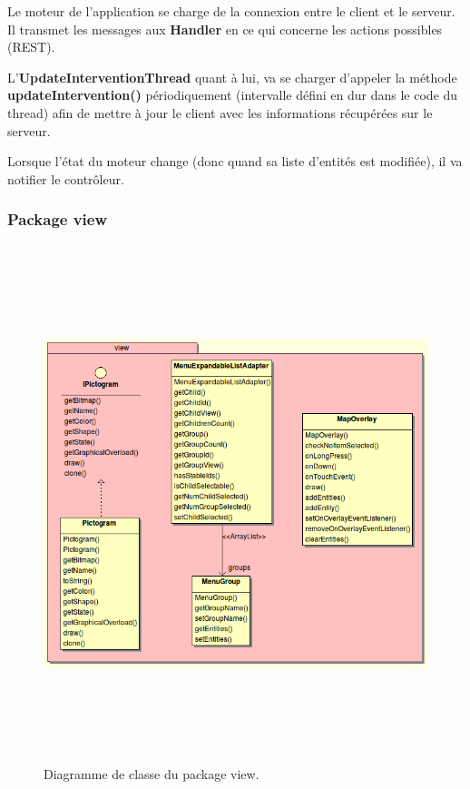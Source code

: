 \documentclass{article}
\begin{document}
Le moteur de l’application se charge de la connexion entre le client et le serveur. Il transmet les messages aux \textbf{Handler} en ce qui concerne les actions possibles (REST).

L’\textbf{UpdateInterventionThread} quant à lui, va se charger d’appeler la méthode \textbf{updateIntervention()} périodiquement (intervalle défini en dur dans le code du thread) afin de mettre à jour le client avec les informations récupérées sur le serveur.

Lorsque l’état du moteur change (donc quand sa liste d'entités est modifiée), il va notifier le contrôleur.
\newpage

\subsubsection{Package view}
\begin{figure}[htbp]
\begin{center}
\includegraphics[width=499pt, height=427pt]{doc_dev-fig009.png}
\caption{Diagramme de classe du package view.}
\end{center}
\end{figure}
\end{document}
